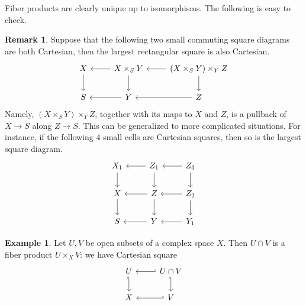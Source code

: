 \documentclass[12pt,b5paper,notitlepage]{report}
\theoremstyle{definition}
\newtheorem{eg}[df]{Example}
\newtheorem{rem}[df]{Remark}
\theoremstyle{plain}
\numberwithin{equation}{section}
\begin{document}
Fiber products are clearly unique up to isomorphisms. The following is easy to check.
\begin{rem}\label{lb31}
Suppose that the following two small commuting square diagrams are both Cartesian, then the largest rectangular square is also Cartesian.
\begin{equation*}
\begin{tikzcd}
X \arrow[d] & X\times_SY \arrow[l] \arrow[d] & (X\times_SY)\times_YZ \arrow[l] \arrow[d] \\
S           & Y \arrow[l]                    & Z \arrow[l]                              
\end{tikzcd}
\end{equation*}
Namely, $(X\times_SY)\times_YZ$, together with its maps to $X$ and $Z$, is a pullback of $X\rightarrow S$ along $Z\rightarrow S$. This can be generalized to more complicated situations. For instance, if the following $4$ small cells are Cartesian squares, then so is the largest square diagram.
\begin{equation*}
\begin{tikzcd}
X_1 \arrow[d] & Z_1 \arrow[l] \arrow[d] & Z_3 \arrow[l] \arrow[d] \\
X \arrow[d]   & Z \arrow[l] \arrow[d]   & Z_2 \arrow[l] \arrow[d] \\
S             & Y \arrow[l]             & Y_1 \arrow[l]          
\end{tikzcd}
\end{equation*}
\end{rem}


\begin{eg}\label{lb34}
Let $U,V$ be open subsets of a complex space $X$. Then $U\cap V$ is a fiber product $U\times_XV$: we have Cartesian square
\begin{equation*}
\begin{tikzcd}
U \arrow[d, hook'] & U\cap V \arrow[l, hook'] \arrow[d, hook'] \\
X                  & V \arrow[l, hook']                       
\end{tikzcd}
\end{equation*}
\end{eg}
\end{document}
